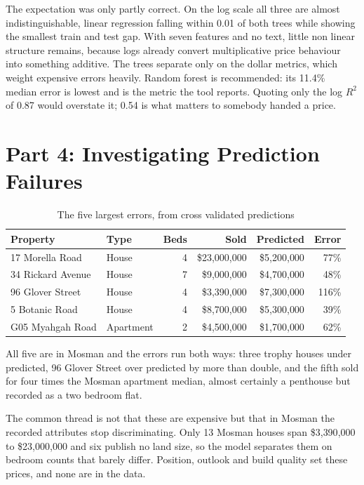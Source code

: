 \documentclass[11pt,a4paper]{article}
\begin{document}
The expectation was only partly correct. On the log scale all three are
almost indistinguishable, linear regression falling within 0.01 of both
trees while showing the smallest train and test gap. With seven features
and no text, little non linear structure remains, because logs already
convert multiplicative price behaviour into something additive. The
trees separate only on the dollar metrics, which weight expensive errors
heavily. Random forest is recommended: its 11.4\% median error is lowest
and is the metric the tool reports. Quoting only the log $R^2$ of 0.87
would overstate it; 0.54 is what matters to somebody handed a price.

\section{Part 4: Investigating Prediction Failures}

\begin{table}[H]
\centering
\small
\caption{The five largest errors, from cross validated predictions}
\label{tab:errors}
\begin{tabular}{llrrrr}
\toprule
\textbf{Property} & \textbf{Type} & \textbf{Beds} & \textbf{Sold} & \textbf{Predicted} & \textbf{Error} \\
\midrule
17 Morella Road    & House     & 4 & \$23{,}000{,}000 & \$5{,}200{,}000 & 77\% \\
34 Rickard Avenue  & House     & 7 & \$9{,}000{,}000  & \$4{,}700{,}000 & 48\% \\
96 Glover Street   & House     & 4 & \$3{,}390{,}000  & \$7{,}300{,}000 & 116\% \\
5 Botanic Road     & House     & 4 & \$8{,}700{,}000  & \$5{,}300{,}000 & 39\% \\
G05 Myahgah Road   & Apartment & 2 & \$4{,}500{,}000  & \$1{,}700{,}000 & 62\% \\
\bottomrule
\end{tabular}
\end{table}

All five are in Mosman and the errors run both ways: three trophy houses
under predicted, 96 Glover Street over predicted by more than double,
and the fifth sold for four times the Mosman apartment median, almost
certainly a penthouse but recorded as a two bedroom flat.

The common thread is not that these are expensive but that in Mosman the
recorded attributes stop discriminating. Only 13 Mosman houses span
\$3{,}390{,}000 to \$23{,}000{,}000 and six publish no land size, so the
model separates them on bedroom counts that barely differ. Position,
outlook and build quality set these prices, and none are in the data.
\end{document}

